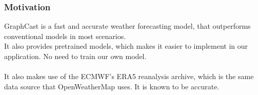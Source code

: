 \documentclass[../paper.tex]{subfiles}
\begin{document}
    \subsubsection{Motivation}
    GraphCast is a fast and accurate weather forecasting model, that outperforms conventional models in most scenarios.\\
    It also provides pretrained models, which makes it easier to implement in our application.
    No need to train our own model.
    \\\\
    It also makes use of the ECMWF's ERA5 reanalysis archive, which is the same data source that OpenWeatherMap uses.
    It is known to be accurate.
\end{document}
